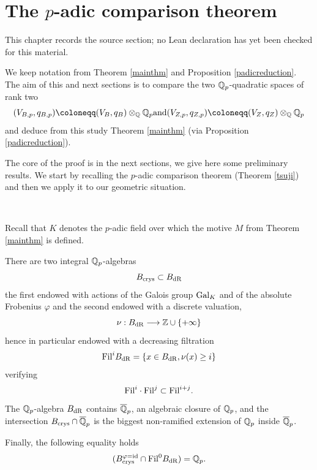 \chapter{The $p$-adic comparison theorem}
\label{standard-conjectures-abelian-fourfolds-chapter-10}

\begin{remark}
\label{standard-conjectures-abelian-fourfolds-chapter-10-source}
This chapter records the source section; no Lean declaration has yet been checked for this material.
\notready
\end{remark}

We keep notation from Theorem \ref{mainthm} and Proposition \ref{padicreduction}.
The aim of this and next sections is to compare the two $\mathbb{Q}_p$-quadratic spaces of rank two
\[ (V_{B,p},q_{B,p}) \coloneqq (V_B,q_B)\otimes_\Q \Q_p   \textrm{and}  (V_{Z,p},q_{Z,p}) \coloneqq (V_Z,q_Z)\otimes_\Q \Q_p\]
and deduce from this study Theorem \ref{mainthm}  (via Proposition \ref{padicreduction}).

The core of the proof is in the next sections, we give here some preliminary results. We start by recalling the $p$-adic comparison theorem (Theorem \ref{tsuji}) and then we apply it to our geometric situation.

\

Recall that $K$ denotes the $p$-adic field over which the motive $M$ from Theorem \ref{mainthm} is defined.



\begin{theorem}
\notready\label{javier} \cite{Fonfon}
There are two integral $\mathbb{Q}_p$-algebras \[B_{\textnormal{crys}} \subset B_{\mathrm{dR}}\] the first endowed with  actions of the Galois group $\textnormal{Gal}_K$ and of the absolute Frobenius $\varphi$ and the second endowed with a discrete valuation,
\[\nu: B_{\mathrm{dR}} \longrightarrow \mathbb{Z} \cup \{+\infty\}\]
hence in particular endowed with a decreasing filtration \[\textnormal{Fil}^i B_{\mathrm{dR}}=\{x \in B_{\mathrm{dR}}, \nu(x)\geq i\}\] verifying
\[\textnormal{Fil}^i \cdot \textnormal{Fil}^j \subset \textnormal{Fil}^{i+j}.\]
The $\mathbb{Q}_p$-algebra $ B_{\mathrm{dR}}$ contains $\overline{\mathbb{Q}}_p$, an algebraic closure of $\mathbb{Q}_p$, and the intersection $ B_{\textnormal{crys}} \cap \overline{\mathbb{Q}}_p$ is the biggest non-ramified extension of $\mathbb{Q}_p$ inside $\overline{\mathbb{Q}}_p$.

Finally, the following equality holds \cite[Theorem 5.3.7]{Fontp}
 \begin{equation}\label{eq:fontaine}(B_{\textnormal{crys}}^{\varphi=\mathrm{id}} \cap \textnormal{Fil}^0B_{\mathrm{dR}})=\mathbb{Q}_p.\end{equation}
\end{theorem}


